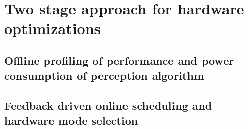 \section{Two stage approach for hardware optimizations}

\subsection{Offline profiling of performance and power consumption of perception algorithm}

\subsection{Feedback driven online scheduling and hardware mode selection}
\label{sec:scheduling}

